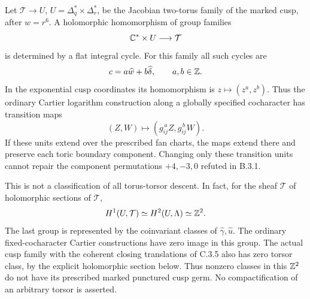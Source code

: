 \begin{proposition}
Let $\mathcal T\to U$, $U=\Delta_q^*\times\Delta_r^*$,
be the Jacobian two-torus family of the marked cusp,
after $w=r^6$.  A holomorphic homomorphism of group
families
\[
 \mathbb C^*\times U\longrightarrow\mathcal T
\]
is determined by a flat integral cycle.  For this family
all such cycles are
\[
 c=a\widehat w+b\widehat\delta,\qquad a,b\in\mathbb Z.
\]
In the exponential cusp coordinates its homomorphism
is $z\mapsto(z^a,z^b)$.  Thus the ordinary Cartier
logarithm construction along a globally specified
cocharacter has transition maps
\[
 (Z,W)\longmapsto(g_{ij}^{\,a}Z,g_{ij}^{\,b}W).
\]
If these units extend over the prescribed fan charts,
the maps extend there and preserve each toric
boundary component.  Changing only these transition
units cannot repair the component permutations
$+4,-3,0$ refuted in B.3.1.

This is not a classification of all torus-torsor
descent.  In fact, for the sheaf $\mathscr T$ of
holomorphic sections of $\mathcal T$,
\[
 H^1(U,\mathcal{T})\simeq H^2(U,\Lambda)\simeq\mathbb Z^2.
\]
The last group is represented by the coinvariant
classes of $\widehat\gamma,\widehat u$.  The ordinary
fixed-cocharacter Cartier constructions have zero
image in this group.  The actual cusp family with
the coherent closing translations of C.3.5 also
has zero torsor class, by the explicit holomorphic
section below.  Thus nonzero classes in this
$\mathbb Z^2$ do not have its prescribed marked punctured
cusp germ.  No compactification of an arbitrary
torsor is asserted.
\end{proposition}
